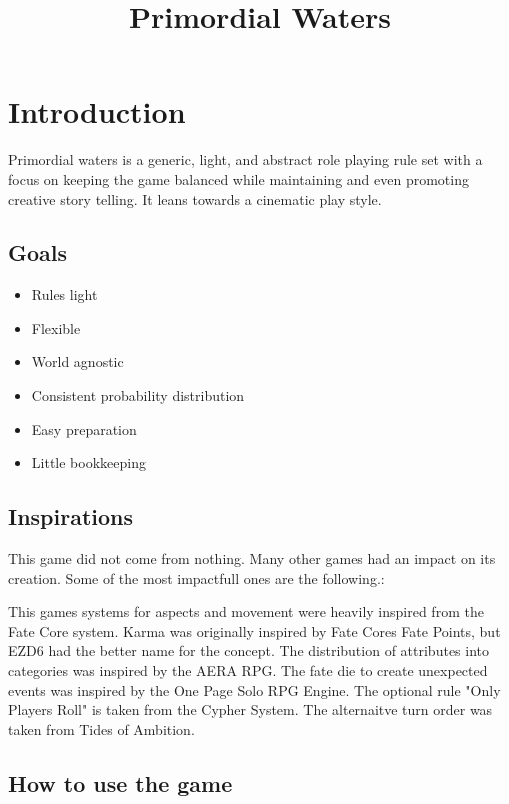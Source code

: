 \documentclass[11pt]{article}
\date{}
\title{Primordial Waters}
\begin{document}
\maketitle
\tableofcontents

{

\section{Introduction}
\label{sec:org444877c}

Primordial waters is a generic, light, and abstract role playing rule set with a focus on keeping the game balanced while maintaining and even promoting creative story telling. It leans towards a cinematic play style.

\subsection{Goals}
\label{sec:orgfc38151}

\begin{itemize}
\item Rules light
\item Flexible
\item World agnostic
\item Consistent probability distribution
\item Easy preparation
\item Little bookkeeping
\end{itemize}

\subsection{Inspirations}
\label{sec:org5f4fca7}

This game did not come from nothing. Many other games had an impact on its creation. Some of the most impactfull ones are the following.:

This games systems for aspects and movement were heavily inspired from the Fate Core system.
Karma was originally inspired by Fate Cores Fate Points, but EZD6 had the better name for the concept.
The distribution of attributes into categories was inspired by the AERA RPG.
The fate die to create unexpected events was inspired by the One Page Solo RPG Engine.
The optional rule "Only Players Roll" is taken from the Cypher System.
The alternaitve turn order was taken from Tides of Ambition.

\subsection{How to use the game}
\label{sec:org3643a00}

}
\end{document}
